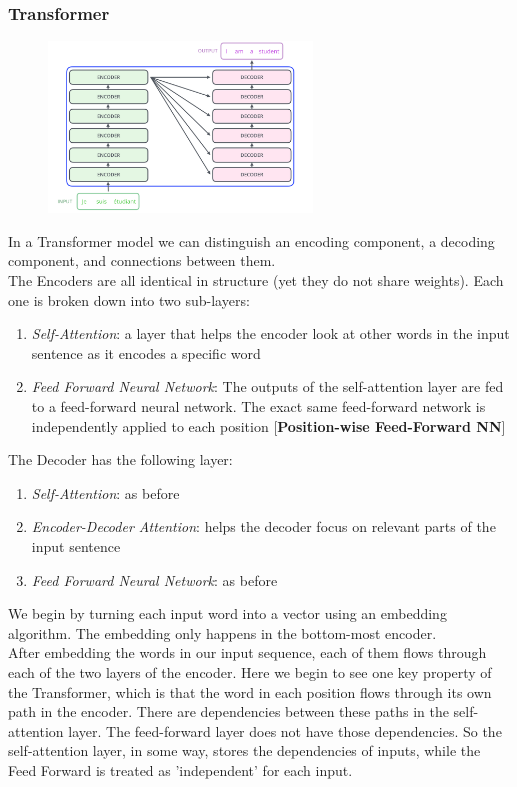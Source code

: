 \subsubsection{Transformer}
\begin{figure}
    \includegraphics[width=7cm]{images/The_transformer_encoder_decoder_stack.png}
\end{figure} 

In a Transformer model we can distinguish an encoding component, a decoding component, and connections between them. \\
The Encoders are all identical in structure (yet they do not share weights). Each one is broken down into two sub-layers:
\begin{enumerate}
    \item \textit{Self-Attention}: a layer that helps the encoder look at other words in the input sentence as it encodes a specific word
    \item \textit{Feed Forward Neural Network}: The outputs of the self-attention layer are fed to a feed-forward neural network. The exact same feed-forward network is independently applied to each position [\textbf{Position-wise Feed-Forward NN}]
\end{enumerate}{}
The Decoder has the following layer:
\begin{enumerate}
    \item \textit{Self-Attention}: as before
    \item \textit{Encoder-Decoder Attention}: helps the decoder focus on relevant parts of the input sentence
    \item \textit{Feed Forward Neural Network}: as before
\end{enumerate}{}

We begin by turning each input word into a vector using an embedding algorithm. The embedding only happens in the bottom-most encoder. \\
After embedding the words in our input sequence, each of them flows through each of the two layers of the encoder. Here we begin to see one key property of the Transformer, which is that the word in each position flows through its own path in the encoder. There are dependencies between these paths in the self-attention layer. The feed-forward layer does not have those dependencies. So the self-attention layer, in some way, stores the dependencies of inputs, while the Feed Forward is treated as 'independent' for each input.\\

